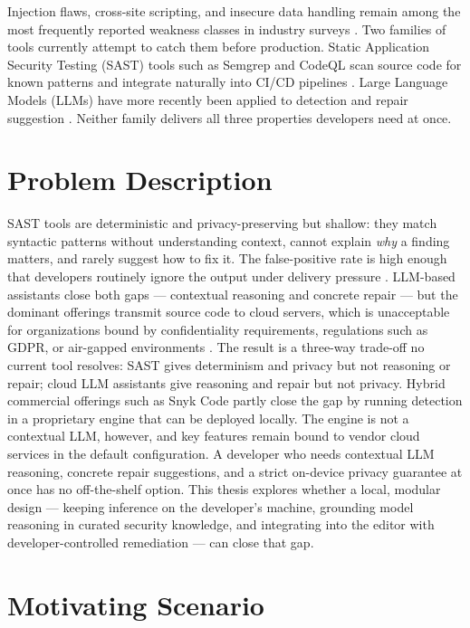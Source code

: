 Injection flaws, cross-site scripting, and insecure data handling remain among the most frequently reported weakness classes in industry surveys \cite{owaspTop10_2021,mitreCWE}. Two families of tools currently attempt to catch them before production. Static Application Security Testing (SAST) tools such as Semgrep and CodeQL scan source code for known patterns and integrate naturally into CI/CD pipelines \cite{bessey2010billion,chess2004staticanalysis}. Large Language Models (LLMs) have more recently been applied to detection and repair suggestion \cite{chen2021codex,openai2023gpt4}. Neither family delivers all three properties developers need at once.

\section{Problem Description}

SAST tools are deterministic and privacy-preserving but shallow: they match syntactic patterns without understanding context, cannot explain \emph{why} a finding matters, and rarely suggest how to fix it. The false-positive rate is high enough that developers routinely ignore the output under delivery pressure \cite{johnson2013don,christakis2016developers}. LLM-based assistants close both gaps --- contextual reasoning and concrete repair --- but the dominant offerings transmit source code to cloud servers, which is unacceptable for organizations bound by confidentiality requirements, regulations such as GDPR, or air-gapped environments \cite{carlini2021extracting,gdpr2016}. The result is a three-way trade-off no current tool resolves: SAST gives determinism and privacy but not reasoning or repair; cloud LLM assistants give reasoning and repair but not privacy. Hybrid commercial offerings such as Snyk Code \cite{snykDocs} partly close the gap by running detection in a proprietary engine that can be deployed locally. The engine is not a contextual LLM, however, and key features remain bound to vendor cloud services in the default configuration. A developer who needs contextual LLM reasoning, concrete repair suggestions, and a strict on-device privacy guarantee at once has no off-the-shelf option. This thesis explores whether a local, modular design --- keeping inference on the developer's machine, grounding model reasoning in curated security knowledge, and integrating into the editor with developer-controlled remediation --- can close that gap.

\section{Motivating Scenario}

